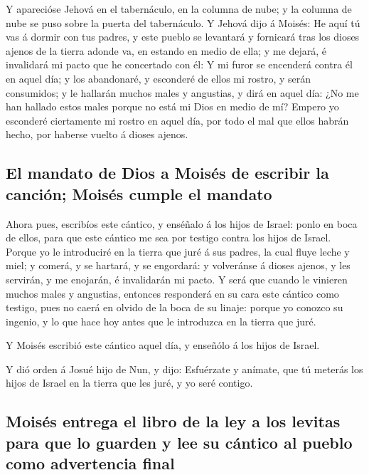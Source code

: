  Y aparecióse Jehová en el tabernáculo, en la columna de
nube; y la columna de nube se puso sobre la puerta del tabernáculo.
 Y Jehová dijo á Moisés: He aquí tú vas á dormir con tus
padres, y este pueblo se levantará y fornicará tras los dioses ajenos de
la tierra adonde va, en estando en medio de ella; y me dejará, é
invalidará mi pacto que he concertado con él:  Y mi furor
se encenderá contra él en aquel día; y los abandonaré, y esconderé de
ellos mi rostro, y serán consumidos; y le hallarán muchos males y
angustias, y dirá en aquel día: ¿No me han hallado estos males porque no
está mi Dios en medio de mí?  Empero yo esconderé
ciertamente mi rostro en aquel día, por todo el mal que ellos habrán
hecho, por haberse vuelto á dioses ajenos.

\hypertarget{el-mandato-de-dios-a-moisuxe9s-de-escribir-la-canciuxf3n-moisuxe9s-cumple-el-mandato}{%
\subsection{El mandato de Dios a Moisés de escribir la canción; Moisés
cumple el
mandato}\label{el-mandato-de-dios-a-moisuxe9s-de-escribir-la-canciuxf3n-moisuxe9s-cumple-el-mandato}}

 Ahora pues, escribíos este cántico, y enséñalo á los hijos
de Israel: ponlo en boca de ellos, para que este cántico me sea por
testigo contra los hijos de Israel.  Porque yo le
introduciré en la tierra que juré á sus padres, la cual fluye leche y
miel; y comerá, y se hartará, y se engordará: y volveránse á dioses
ajenos, y les servirán, y me enojarán, é invalidarán mi pacto.
 Y será que cuando le vinieren muchos males y angustias,
entonces responderá en su cara este cántico como testigo, pues no caerá
en olvido de la boca de su linaje: porque yo conozco su ingenio, y lo
que hace hoy antes que le introduzca en la tierra que juré.

 Y Moisés escribió este cántico aquel día, y enseñólo á los
hijos de Israel.

 Y dió orden á Josué hijo de Nun, y dijo: Esfuérzate y
anímate, que tú meterás los hijos de Israel en la tierra que les juré, y
yo seré contigo.

\hypertarget{moisuxe9s-entrega-el-libro-de-la-ley-a-los-levitas-para-que-lo-guarden-y-lee-su-cuxe1ntico-al-pueblo-como-advertencia-final}{%
\subsection{Moisés entrega el libro de la ley a los levitas para que lo
guarden y lee su cántico al pueblo como advertencia
final}\label{moisuxe9s-entrega-el-libro-de-la-ley-a-los-levitas-para-que-lo-guarden-y-lee-su-cuxe1ntico-al-pueblo-como-advertencia-final}}

